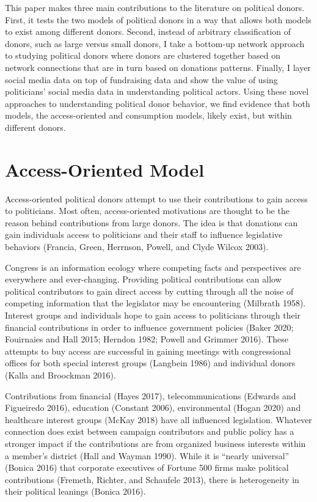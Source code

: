 \documentclass[12pt,]{article}
\begin{document}
This paper makes three main contributions to the literature on political
donors. First, it tests the two models of political donors in a way that
allows both models to exist among different donors. Second, instead of
arbitrary classification of donors, such as large versus small donors, I
take a bottom-up network approach to studying political donors where
donors are clustered together based on network connections that are in
turn based on donations patterns. Finally, I layer social media data on
top of fundraising data and show the value of using politicians' social
media data in understanding political actors. Using these novel
approaches to understanding political donor behavior, we find evidence
that both models, the access-oriented and consumption models, likely
exist, but within different donors.

\hypertarget{access-oriented-model}{%
\section{Access-Oriented Model}\label{access-oriented-model}}

Access-oriented political donors attempt to use their contributions to
gain access to politicians. Most often, access-oriented motivations are
thought to be the reason behind contributions from large donors. The
idea is that donations can gain individuals access to politicians and
their staff to influence legislative behaviors (Francia, Green,
Herrnson, Powell, and Clyde Wilcox 2003).

Congress is an information ecology where competing facts and
perspectives are everywhere and ever-changing. Providing political
contributions can allow political contributors to gain direct access by
cutting through all the noise of competing information that the
legislator may be encountering (Milbrath 1958). Interest groups and
individuals hope to gain access to politicians through their financial
contributions in order to influence government policies (Baker 2020;
Fouirnaies and Hall 2015; Herndon 1982; Powell and Grimmer 2016). These
attempts to buy access are successful in gaining meetings with
congressional offices for both special interest groups (Langbein 1986)
and individual donors (Kalla and Broockman 2016).

Contributions from financial (Hayes 2017), telecommunications (Edwards
and Figueiredo 2016), education (Constant 2006), environmental (Hogan
2020) and healthcare interest groups (McKay 2018) have all influenced
legislation. Whatever connection does exist between campaign
contributors and public policy has a stronger impact if the
contributions are from organized business interests within a member's
district (Hall and Wayman 1990). While it is ``nearly universal''
(Bonica 2016) that corporate executives of Fortune 500 firms make
political contributions (Fremeth, Richter, and Schaufele 2013), there is
heterogeneity in their political leanings (Bonica 2016).
\end{document}

